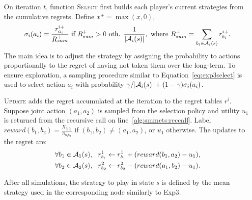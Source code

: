 On iteration $t$, function \textsc{Select} first builds
each player's current strategies from the cumulative regrets. Define $x^+ = \max(x,0)$,
\begin{equation}
\sigma_i(a_i) = \frac{r^{i+}_{a_i}}{R^+_{sum}} \mbox{ if } R^+_{sum} > 0
\mbox{ oth. } \frac{1}{|\mathcal{A}_i(s)|}, \mbox{ where } R^+_{sum} = \sum_{b_i \in \mathcal{A}_i(s)}{r^{i+}_{b_i}}.
\end{equation}
The main idea is to adjust the strategy by assigning the probability to actions proportionally to the regret of having not taken them over the long-term.
To ensure exploration, a sampling procedure similar to Equation~\ref{eq:exp3select} is used to select action $a_i$ with probability
$\gamma/|\mathcal{A}_i(s)| + (1-\gamma) \sigma_i(a_i)$.

\textsc{Update} adds the regret accumulated at the iteration to
the regret tables $r^i$. Suppose joint action $(a_1,a_2)$ is
sampled from the selection policy and utility $u_1$ is returned from the recursive call on line~\ref{alg:smmcts:reccall}.
Label $reward(b_1,b_2) = \frac{X_{b_1b_2}}{n_{b_1b_2}}$ if
$(b_1,b_2) \not= (a_1,a_2)$, or $u_1$ otherwise. The updates to the regret are:
\begin{eqnarray}
\forall b_1 \in \mathcal{A}_1(s), ~~  r^1_{b_1} \leftarrow r^1_{b_1} + ( reward(b_1, a_2) - u_1 ),\\
\forall b_2 \in \mathcal{A}_2(s), ~~  r^2_{b_2} \leftarrow r^2_{b_2} - ( reward(a_1, b_2) - u_1).
\end{eqnarray}

After all simulations, the strategy to play in state $s$ is defined by the mean strategy used in the corresponding node similarly to Exp3.

